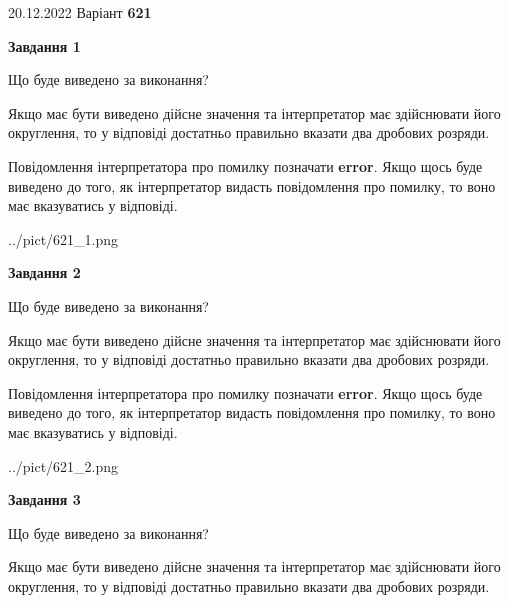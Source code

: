 \documentclass[12pt, ukrainian]{article}
\begin{document}
{20.12.2022 Варіант \No \textbf { 621 }\par}
{
\begin {Large}

{\begin {center}\textbf{Завдання 1}\end {center}}\par
Що буде виведено за виконання? \par

Якщо має бути виведено дійсне значення та інтерпретатор має здійснювати його округлення, 
то у відповіді достатньо правильно вказати два дробових розряди.

Повідомлення інтерпретатора про помилку позначати \textbf{error}.
Якщо щось буде виведено до того, як інтерпретатор видасть повідомлення про помилку, 
то воно має вказуватись у відповіді. \par

\begin{center}
	{../pict/621_1.png}
\end{center}
\newpage

{\begin {center}\textbf{Завдання 2}\end {center}}\par
Що буде виведено за виконання? \par

Якщо має бути виведено дійсне значення та інтерпретатор має здійснювати його округлення, 
то у відповіді достатньо правильно вказати два дробових розряди.

Повідомлення інтерпретатора про помилку позначати \textbf{error}.
Якщо щось буде виведено до того, як інтерпретатор видасть повідомлення про помилку, 
то воно має вказуватись у відповіді. \par

\begin{center}
	{../pict/621_2.png}
\end{center}
\newpage

{\begin {center}\textbf{Завдання 3}\end {center}}\par
Що буде виведено за виконання? \par

Якщо має бути виведено дійсне значення та інтерпретатор має здійснювати його округлення, 
то у відповіді достатньо правильно вказати два дробових розряди.


\end{Large}}
\end{document}
